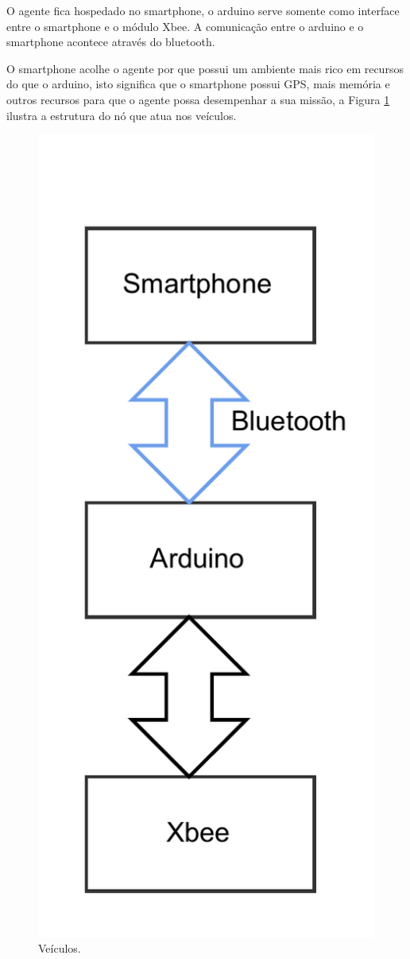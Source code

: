 O agente fica hospedado no smartphone, o arduino serve somente como interface entre o smartphone e o módulo Xbee. A comunicação entre o arduino e o smartphone acontece através do bluetooth. 

O smartphone acolhe o agente por que possui um ambiente mais rico em recursos do que o arduino, isto significa que o smartphone possui GPS, mais memória e outros recursos para que o agente possa desempenhar a sua missão, a Figura \ref{fig:arquiteturaPrototipoVeiculo} ilustra a estrutura do nó que atua nos veículos. 

\begin{figure}[htbp]
	\centering
	\includegraphics[scale=0.5]{metodologia/figuras/arquiteturaPrototipoVeiculo.pdf}
	\caption{Veículos.}
	\label{fig:arquiteturaPrototipoVeiculo}
\end{figure}

